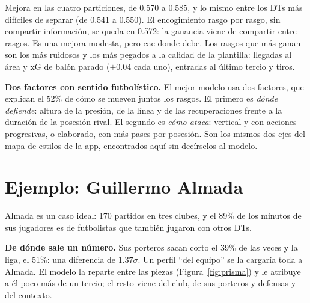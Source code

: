 \documentclass[10pt,a4paper,twocolumn]{article}
\begin{document}
Mejora en las cuatro particiones, de 0.570 a 0.585, y lo mismo entre los DTs más difíciles de separar (de 0.541 a 0.550). El encogimiento rasgo por rasgo, sin compartir información, se queda en 0.572: la ganancia viene de compartir entre rasgos. Es una mejora modesta, pero cae donde debe. Los rasgos que más ganan son los más ruidosos y los más pegados a la calidad de la plantilla: llegadas al área y xG de balón parado ($+0.04$ cada uno), entradas al último tercio y tiros.

\textbf{Dos factores con sentido futbolístico.} El mejor modelo usa dos factores, que explican el 52\% de cómo se mueven juntos los rasgos. El primero es \emph{dónde defiende}: altura de la presión, de la línea y de las recuperaciones frente a la duración de la posesión rival. El segundo es \emph{cómo ataca}: vertical y con acciones progresivas, o elaborado, con más pases por posesión. Son los mismos dos ejes del mapa de estilos de la app, encontrados aquí sin decírselos al modelo.

\section{Ejemplo: Guillermo Almada}
Almada es un caso ideal: 170 partidos en tres clubes, y el 89\% de los minutos de sus jugadores es de futbolistas que también jugaron con otros DTs.

\textbf{De dónde sale un número.} Sus porteros sacan corto el 39\% de las veces y la liga, el 51\%: una diferencia de $1.37\sigma$. Un perfil ``del equipo'' se la cargaría toda a Almada. El modelo la reparte entre las piezas (Figura~\ref{fig:prisma}) y le atribuye a él poco más de un tercio; el resto viene del club, de sus porteros y defensas y del contexto.
\end{document}
